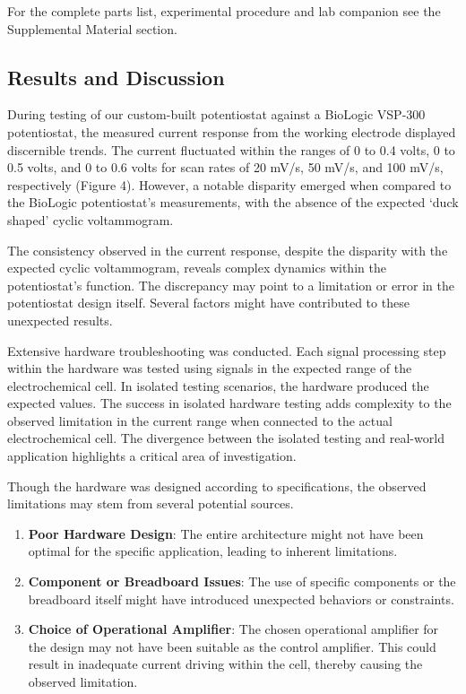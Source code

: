 \documentclass{article}
\begin{document}
For the complete parts list, experimental procedure and lab companion see the Supplemental Material section.

\subsection*{Results and Discussion}
During testing of our custom-built potentiostat against a BioLogic VSP-300 potentiostat, the measured current response from the working electrode displayed discernible trends. The current fluctuated within the ranges of 0 to 0.4 volts, 0 to 0.5 volts, and 0 to 0.6 volts for scan rates of 20 mV/s, 50 mV/s, and 100 mV/s, respectively (Figure 4). However, a notable disparity emerged when compared to the BioLogic potentiostat's measurements, with the absence of the expected `duck shaped' cyclic voltammogram.

The consistency observed in the current response, despite the disparity with the expected cyclic voltammogram, reveals complex dynamics within the potentiostat's function. The discrepancy may point to a limitation or error in the potentiostat design itself. Several factors might have contributed to these unexpected results.

Extensive hardware troubleshooting was conducted. Each signal processing step within the hardware was tested using signals in the expected range of the electrochemical cell. In isolated testing scenarios, the hardware produced the expected values. The success in isolated hardware testing adds complexity to the observed limitation in the current range when connected to the actual electrochemical cell. The divergence between the isolated testing and real-world application highlights a critical area of investigation.

Though the hardware was designed according to specifications, the observed limitations may stem from several potential sources.
\begin{enumerate}
    \item \textbf{Poor Hardware Design}: The entire architecture might not have been optimal for the specific application, leading to inherent limitations.
    \item \textbf{Component or Breadboard Issues}: The use of specific components or the breadboard itself might have introduced unexpected behaviors or constraints.
    \item \textbf{Choice of Operational Amplifier}: The chosen operational amplifier for the design may not have been suitable as the control amplifier. This could result in inadequate current driving within the cell, thereby causing the observed limitation.
\end{enumerate}
\end{document}
